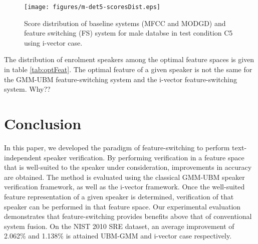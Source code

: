 \documentclass{article}
\begin{document}
\begin{figure}[h!tb]
\centering
\vspace{-2cm}
\texttt{[image: figures/m-det5-scoresDist.eps]}
\caption{Score distribution of baseline systems (MFCC and MODGD) and feature switching (FS) system for male databse in test condition C5 using i-vector case.}
\label{fig:scoreDist}
\end{figure}

%
%



The distribution of enrolment speakers among the optimal feature spaces
is given in table \ref{tab:optFeat}. The optimal feature of a given speaker is
not the same for the GMM-UBM feature-switching system and the i-vector
feature-switching system. Why?? 

\section{Conclusion}
\label{sec:conclude}

In this paper, we developed the paradigm of feature-switching to perform
text-independent speaker verification. By performing verification in a
feature space that is well-suited to the speaker under consideration,
improvements in accuracy are obtained. The method is evaluated using the
classical GMM-UBM speaker verification framework, as well as the i-vector
framework. Once the well-suited feature representation of a given speaker is
determined, verification of that speaker can be performed in that feature space.
Our experimental evaluation demonstrates that feature-switching
provides benefits above that of conventional system fusion. On the NIST 2010 SRE
dataset, an average improvement of 2.062\% and 1.138\% is attained UBM-GMM and i-vector case respectively.
\end{document}
